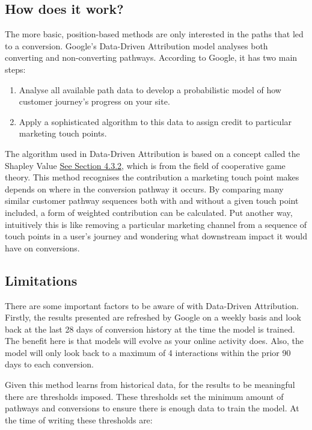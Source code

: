 \documentclass[]{book}
\begin{document}
\subsection{How does it work?}\label{how-does-it-work}

The more basic, position-based methods are only interested in the paths
that led to a conversion. Google's Data-Driven Attribution model
analyses both converting and non-converting pathways. According to
Google, it has two main steps:

\begin{enumerate}
\def\labelenumi{\arabic{enumi}.}
\item
  Analyse all available path data to develop a probabilistic model of
  how customer journey's progress on your site.
\item
  Apply a sophisticated algorithm to this data to assign credit to
  particular marketing touch points.
\end{enumerate}

The algorithm used in Data-Driven Attribution is based on a concept
called the Shapley Value \protect\hyperlink{shapley-value}{See Section
4.3.2}, which is from the field of cooperative game theory. This method
recognises the contribution a marketing touch point makes depends on
where in the conversion pathway it occurs. By comparing many similar
customer pathway sequences both with and without a given touch point
included, a form of weighted contribution can be calculated. Put another
way, intuitively this is like removing a particular marketing channel
from a sequence of touch points in a user's journey and wondering what
downstream impact it would have on conversions.

\subsection{Limitations}\label{limitations}

There are some important factors to be aware of with Data-Driven
Attribution. Firstly, the results presented are refreshed by Google on a
weekly basis and look back at the last 28 days of conversion history at
the time the model is trained. The benefit here is that models will
evolve as your online activity does. Also, the model will only look back
to a maximum of 4 interactions within the prior 90 days to each
conversion.

Given this method learns from historical data, for the results to be
meaningful there are thresholds imposed. These thresholds set the
minimum amount of pathways and conversions to ensure there is enough
data to train the model. At the time of writing these thresholds are:
\end{document}

